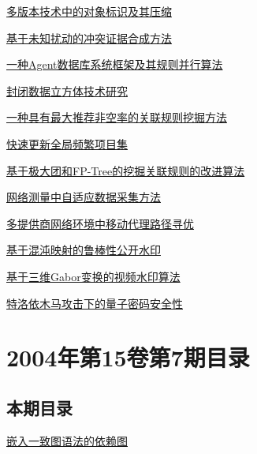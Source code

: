 \documentclass[a4paper]{article}
\begin{document}
\href{http://www.jos.org.cn/ch/reader/download_pdf.aspx?file_no=20040804&year_id=2004&quarter_id=8&falg=1}{多版本技术中的对象标识及其压缩}

\href{http://www.jos.org.cn/ch/reader/download_pdf.aspx?file_no=20040806&year_id=2004&quarter_id=8&falg=1}{基于未知扰动的冲突证据合成方法}

\href{http://www.jos.org.cn/ch/reader/download_pdf.aspx?file_no=20040807&year_id=2004&quarter_id=8&falg=1}{一种Agent数据库系统框架及其规则并行算法}

\href{http://www.jos.org.cn/ch/reader/download_pdf.aspx?file_no=20040808&year_id=2004&quarter_id=8&falg=1}{封闭数据立方体技术研究}

\href{http://www.jos.org.cn/ch/reader/download_pdf.aspx?file_no=20040810&year_id=2004&quarter_id=8&falg=1}{一种具有最大推荐非空率的关联规则挖掘方法}

\href{http://www.jos.org.cn/ch/reader/download_pdf.aspx?file_no=20040811&year_id=2004&quarter_id=8&falg=1}{快速更新全局频繁项目集}

\href{http://www.jos.org.cn/ch/reader/download_pdf.aspx?file_no=20040812&year_id=2004&quarter_id=8&falg=1}{基于极大团和FP-Tree的挖掘关联规则的改进算法}

\href{http://www.jos.org.cn/ch/reader/download_pdf.aspx?file_no=20040815&year_id=2004&quarter_id=8&falg=1}{网络测量中自适应数据采集方法}

\href{http://www.jos.org.cn/ch/reader/download_pdf.aspx?file_no=20040816&year_id=2004&quarter_id=8&falg=1}{多提供商网络环境中移动代理路径寻优}

\href{http://www.jos.org.cn/ch/reader/download_pdf.aspx?file_no=20040817&year_id=2004&quarter_id=8&falg=1}{基于混沌映射的鲁棒性公开水印}

\href{http://www.jos.org.cn/ch/reader/download_pdf.aspx?file_no=20040818&year_id=2004&quarter_id=8&falg=1}{基于三维Gabor变换的视频水印算法}

\href{http://www.jos.org.cn/ch/reader/download_pdf.aspx?file_no=20040819&year_id=2004&quarter_id=8&falg=1}{特洛依木马攻击下的量子密码安全性}


\section{\textbf{2004年第15卷第7期目录}}
\subsection{本期目录}
\href{http://www.jos.org.cn/ch/reader/download_pdf.aspx?file_no=20040702&year_id=2004&quarter_id=7&falg=1}{嵌入一致图语法的依赖图}
\end{document}
